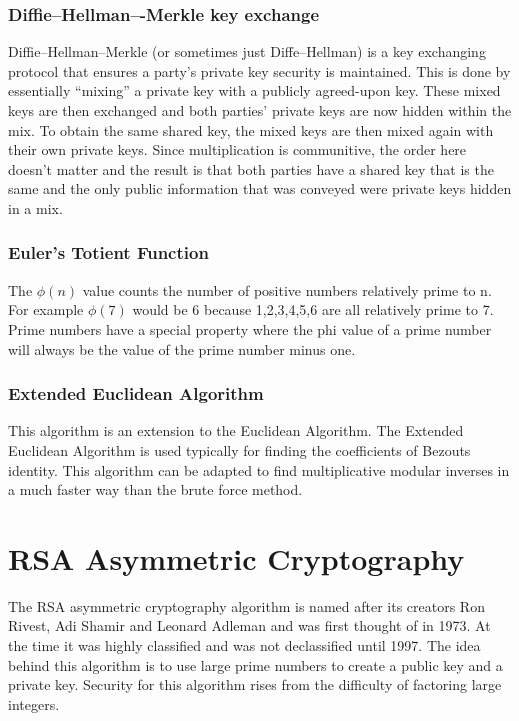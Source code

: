 \documentclass[conference]{IEEEtran}
\begin{document}
\subsubsection{Diffie--Hellman–-Merkle key exchange}
Diffie--Hellman--Merkle (or sometimes just Diffe--Hellman) is a key exchanging protocol that ensures a party's private key security is maintained. This is done by essentially ``mixing'' a private key with a publicly agreed-upon key. These mixed keys are then exchanged and both parties' private keys are now hidden within the mix. To obtain the same shared key, the mixed keys are then mixed again with their own private keys. Since multiplication is communitive, the order here doesn't matter and the result is that both parties have a shared key that is the same and the only public information that was conveyed were private keys hidden in a mix.



\subsubsection{Euler's Totient Function}
The $\phi \left( n \right)$ value counts the number of positive numbers relatively prime to n.
For example $\phi(7)$ would be 6 because 1,2,3,4,5,6 are all relatively prime to 7.
Prime numbers have a special property where the phi value of a prime number will always be the value of the prime number minus one.



\subsubsection{Extended Euclidean Algorithm}
This algorithm is an extension to the Euclidean Algorithm. The Extended Euclidean Algorithm is used typically for finding the coefficients of Bezouts identity. This algorithm can be adapted to find multiplicative modular inverses in a much faster way than the brute force method.

\section{RSA Asymmetric Cryptography}


The RSA asymmetric cryptography algorithm is named after its creators Ron Rivest, Adi Shamir and Leonard Adleman and was first thought of in 1973.
At the time it was highly classified and was not declassified until 1997.
The idea behind this algorithm is to use large prime numbers to create a public key and a private key.
Security for this algorithm rises from the difficulty of factoring large integers.
\end{document}
